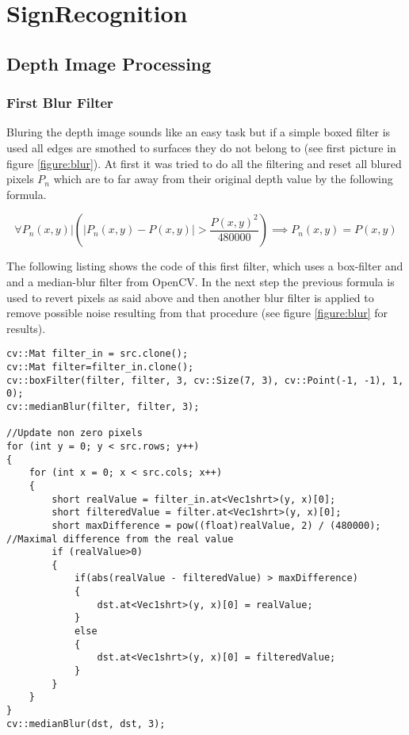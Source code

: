 \chapter{SignRecognition}
\graphicspath{{./Software/img/}}
 
\section{Depth Image Processing}


\subsection{First Blur Filter}
Bluring the depth image sounds like an easy task but if a simple boxed filter is used all edges are smothed to surfaces
they do not belong to (see first picture in figure \vref{figure:blur}).
At first it was tried to do all the filtering and reset all blured pixels $P_n$ which are to far away from their 
original depth value by the following formula.

\[
 \forall P_n(x,y)  |   \left(\left|{P_n(x,y)-P(x,y)}\right|>{\frac{P(x,y)^2}{480000}}\right)\implies P_n(x,y)=P(x,y)
\]

The following listing shows the code of this first filter, which uses a box-filter and and a median-blur filter from
OpenCV. In the next step the previous formula is used to revert pixels as said above and then another blur filter 
is applied to remove possible noise resulting from that procedure (see figure \vref{figure:blur} for results).

{
\tiny
\newpage
\begin{lstlisting}
cv::Mat filter_in = src.clone();
cv::Mat filter=filter_in.clone();
cv::boxFilter(filter, filter, 3, cv::Size(7, 3), cv::Point(-1, -1), 1, 0);
cv::medianBlur(filter, filter, 3);

//Update non zero pixels
for (int y = 0; y < src.rows; y++)
{
	for (int x = 0; x < src.cols; x++)
	{
		short realValue = filter_in.at<Vec1shrt>(y, x)[0];
		short filteredValue = filter.at<Vec1shrt>(y, x)[0];
		short maxDifference = pow((float)realValue, 2) / (480000); //Maximal difference from the real value
		if (realValue>0)
		{
			if(abs(realValue - filteredValue) > maxDifference)
			{
				dst.at<Vec1shrt>(y, x)[0] = realValue;
			}
			else
			{
				dst.at<Vec1shrt>(y, x)[0] = filteredValue;
			}
		}
	}
}
cv::medianBlur(dst, dst, 3);

\end{lstlisting}
}


